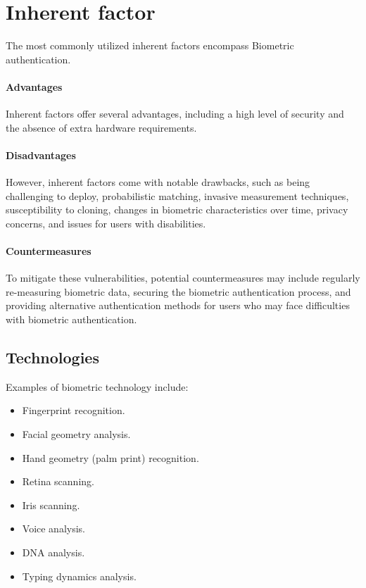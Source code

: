 \section{Inherent factor}

The most commonly utilized inherent factors encompass Biometric authentication. 

\paragraph*{Advantages}
Inherent factors offer several advantages, including a high level of security and the absence of extra hardware requirements.

\paragraph*{Disadvantages}
However, inherent factors come with notable drawbacks, such as being challenging to deploy, probabilistic matching, invasive measurement techniques, susceptibility to cloning, changes in biometric characteristics over time, privacy concerns, and issues for users with disabilities.

\paragraph*{Countermeasures}
To mitigate these vulnerabilities, potential countermeasures may include regularly re-measuring biometric data, securing the biometric authentication process, and providing alternative authentication methods for users who may face difficulties with biometric authentication.

\subsection{Technologies}
Examples of biometric technology include:
\begin{itemize}
    \item Fingerprint recognition.
    \item Facial geometry analysis.
    \item Hand geometry (palm print) recognition.
    \item Retina scanning.
    \item Iris scanning.
    \item Voice analysis.
    \item DNA analysis.
    \item Typing dynamics analysis.
\end{itemize}

